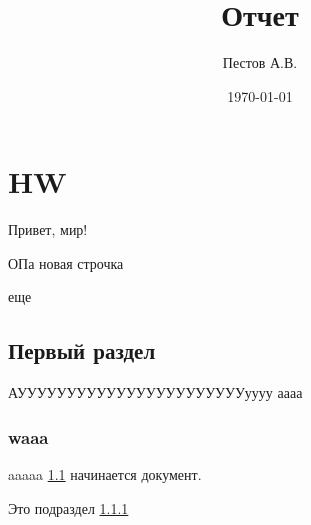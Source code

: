 \documentclass[a4paper, 12pt]{report} %
\author{Пестов А.В.}
\title{Отчет}
\date{\today}
\begin{document}
\maketitle

\chapter{HW}
Привет, мир!

ОПа новая строчка

еще

\section{Первый раздел}\label{razdel}

АУУУУУУУУУУУУУУУУУУУУУУУуууу  аааа

\subsection{waaa}\label{podrazdel}

aaaaa \ref{razdel} начинается документ.

Это подраздел \ref{podrazdel}
\end{document}
